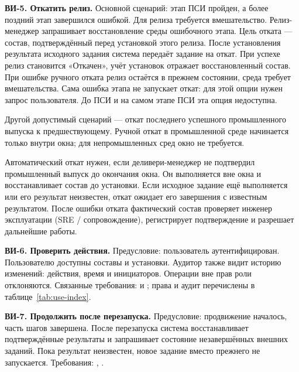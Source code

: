 \documentclass{tpks}
\begin{document}
\textbf{ВИ-5. Откатить релиз.} Основной сценарий: этап ПСИ пройден, а более поздний
этап завершился ошибкой. Для релиза требуется вмешательство.
Релиз-менеджер запрашивает восстановление среды ошибочного этапа.
Цель отката --- состав, подтверждённый перед установкой этого релиза.
После установления результата исходного задания система передаёт задание на откат.
При успехе релиз становится «Откачен», учёт установок отражает восстановленный состав.
При ошибке ручного отката релиз остаётся в прежнем состоянии, среда требует вмешательства.
Сама ошибка этапа не запускает откат: для этой опции нужен запрос пользователя.
До ПСИ и на самом этапе ПСИ эта опция недоступна.

Другой допустимый сценарий --- откат последнего успешного промышленного выпуска
к предшествующему. Ручной откат в промышленной среде начинается только внутри окна;
для непромышленных сред окно не требуется.

Автоматический откат нужен, если деливери-менеджер не подтвердил промышленный
выпуск до окончания окна. Он выполняется вне окна
и восстанавливает состав до установки. Если исходное задание ещё выполняется
или его результат неизвестен, откат ожидает его завершения с известным результатом.
После ошибки отката фактический состав проверяет инженер эксплуатации (SRE / сопровождение),
регистрирует подтверждение и разрешает дальнейшие работы.

\textbf{ВИ-6. Проверить действия.} Предусловие: пользователь аутентифицирован.
Пользователю доступны составы и установки. Аудитор также видит историю изменений:
действия, время и инициаторов. Операции вне прав роли отклоняются.
Связанные требования:  и ; права и аудит перечислены в таблице~\ref{tab:use-index}.

\textbf{ВИ-7. Продолжить после перезапуска.} Предусловие: продвижение началось,
часть шагов завершена. После перезапуска система восстанавливает подтверждённые
результаты и запрашивает состояние незавершённых внешних заданий. Пока результат
неизвестен, новое задание вместо прежнего не запускается. Требования:
, .
\end{document}

